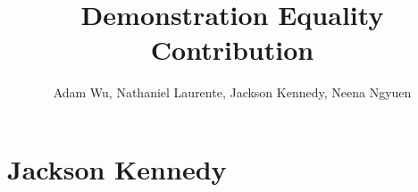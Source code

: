 \documentclass{article}
\begin{document}
\title{Demonstration Equality Contribution}
\author{Adam Wu, Nathaniel Laurente, Jackson Kennedy, Neena Ngyuen}
\maketitle



\section{Jackson Kennedy}
















\end{document}
